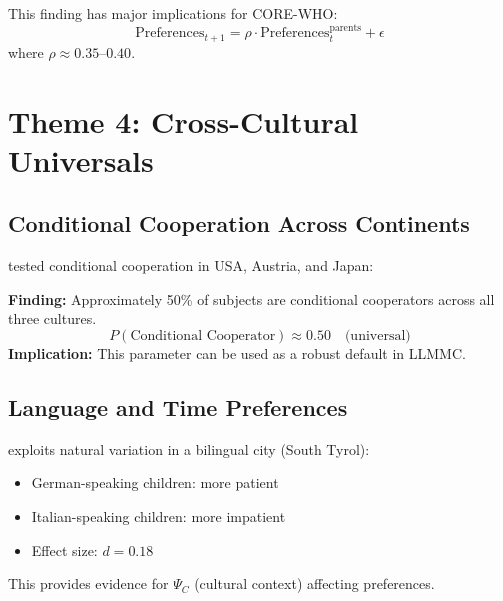 This finding has major implications for CORE-WHO:
\begin{equation}
\text{Preferences}_{t+1} = \rho \cdot \text{Preferences}_t^{\text{parents}} + \epsilon
\end{equation}
where $\rho \approx 0.35$--$0.40$.


\section{Theme 4: Cross-Cultural Universals}
\label{sec:su-crosscultural}

\subsection{Conditional Cooperation Across Continents}

\citet{kocher2008conditional} tested conditional cooperation in USA, Austria, and Japan:

\begin{tcolorbox}[colback=green!5!white, colframe=green!75!black,
    title=Key Result SU-5: Universal Conditional Cooperation]
\textbf{Finding:} Approximately 50\% of subjects are conditional cooperators across all three cultures.
\begin{equation}
P(\text{Conditional Cooperator}) \approx 0.50 \quad \text{(universal)}
\end{equation}
\textbf{Implication:} This parameter can be used as a robust default in LLMMC.
\end{tcolorbox}

\subsection{Language and Time Preferences}

\citet{sutter2018language} exploits natural variation in a bilingual city (South Tyrol):
\begin{itemize}
\item German-speaking children: more patient
\item Italian-speaking children: more impatient
\item Effect size: $d = 0.18$
\end{itemize}

This provides evidence for $\Psi_C$ (cultural context) affecting preferences.


